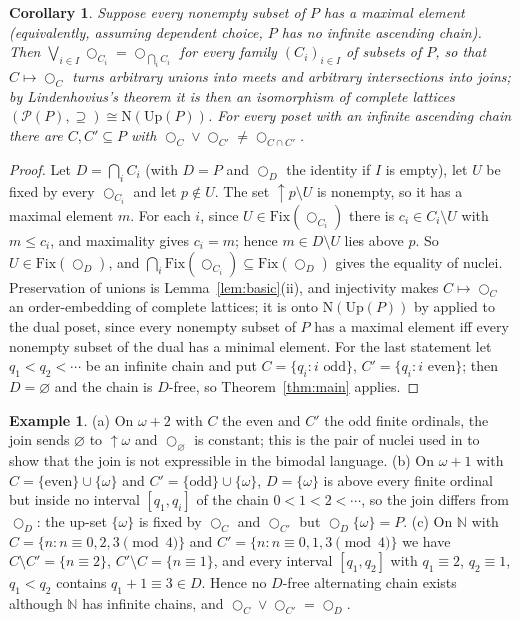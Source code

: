 \documentclass[11pt]{amsart}
\newtheorem{cor}[thm]{Corollary}
\theoremstyle{definition}
\newtheorem{ex}[thm]{Example}
\newcommand{\Fix}{\mathrm{Fix}}
\newcommand{\Up}{\mathrm{Up}}
\newcommand{\Nuc}{\mathrm{N}}
\newcommand{\lax}{\bigcirc}
\newcommand{\pow}{\mathcal P}
\newcommand{\upa}{{\uparrow}}
\begin{document}
\begin{cor}\label{cor:embed}
Suppose every nonempty subset of $P$ has a maximal element (equivalently,
assuming dependent choice, $P$ has no infinite ascending chain). Then
$\bigvee_{i\in I}\lax_{C_i}=\lax_{\bigcap_iC_i}$ for every family
$(C_i)_{i\in I}$ of subsets of $P$, so that $C\mapsto\lax_C$ turns arbitrary
unions into meets and arbitrary intersections into joins; by Lindenhovius's
theorem it is then an isomorphism of complete lattices
$(\pow(P),\supseteq)\cong\Nuc(\Up(P))$. For every poset with an infinite
ascending chain there are $C,C'\subseteq P$ with
$\lax_C\vee\lax_{C'}\ne\lax_{C\cap C'}$.
\end{cor}
\begin{proof}
Let $D=\bigcap_iC_i$ (with $D=P$ and $\lax_D$ the identity if $I$ is empty),
let $U$ be fixed by every $\lax_{C_i}$ and let $p\notin U$. The set
$\upa p\setminus U$ is nonempty, so it has a maximal element $m$. For each
$i$, since $U\in\Fix(\lax_{C_i})$ there is $c_i\in C_i\setminus U$ with
$m\le c_i$, and maximality gives $c_i=m$; hence $m\in D\setminus U$ lies
above $p$. So $U\in\Fix(\lax_D)$, and $\bigcap_i\Fix(\lax_{C_i})\subseteq
\Fix(\lax_D)$ gives the equality of nuclei. Preservation of unions is
Lemma~\ref{lem:basic}(ii), and injectivity makes $C\mapsto\lax_C$ an
order-embedding of complete lattices; it is onto $\Nuc(\Up(P))$ by
\cite[Thm.~2.12]{Lindenhovius} applied to the dual poset, since every
nonempty subset of $P$ has a maximal element iff every nonempty subset of the
dual has a minimal element. For the last statement let $q_1<q_2<\cdots$ be an
infinite chain and put $C=\{q_i:i\text{ odd}\}$, $C'=\{q_i:i\text{ even}\}$;
then $D=\varnothing$ and the chain is $D$-free, so Theorem~\ref{thm:main}
applies.
\end{proof}

\begin{ex}\label{ex:examples}
(a) On $\omega+2$ with $C$ the even and $C'$ the odd finite ordinals, the
join sends $\varnothing$ to $\upa\omega$ and $\lax_\varnothing$ is constant;
this is the pair of nuclei used in \cite[\S5]{Laxjoin} to show that the join
is not expressible in the bimodal language.
(b) On $\omega+1$ with $C=\{\text{even}\}\cup\{\omega\}$ and
$C'=\{\text{odd}\}\cup\{\omega\}$, $D=\{\omega\}$ is above every finite
ordinal but inside no interval $[q_1,q_i]$ of the chain $0<1<2<\cdots$, so
the join differs from $\lax_D$: the up-set $\{\omega\}$ is fixed by $\lax_C$
and $\lax_{C'}$ but $\lax_D\{\omega\}=P$.
(c) On $\mathbb N$ with $C=\{n:n\equiv0,2,3\pmod4\}$ and
$C'=\{n:n\equiv0,1,3\pmod 4\}$ we have $C\setminus C'=\{n\equiv2\}$,
$C'\setminus C=\{n\equiv1\}$, and every interval $[q_1,q_2]$ with
$q_1\equiv2$, $q_2\equiv1$, $q_1<q_2$ contains $q_1+1\equiv3\in D$. Hence no
$D$-free alternating chain exists although $\mathbb N$ has infinite chains,
and $\lax_C\vee\lax_{C'}=\lax_D$.
\end{ex}
\end{document}
